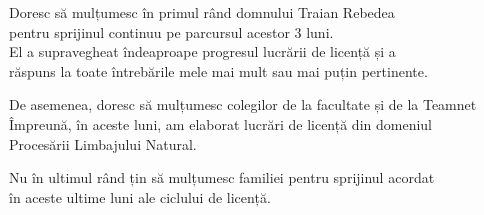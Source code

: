 \vspace*{7cm}
\begin{center}
Doresc să mulțumesc în primul rând domnului Traian Rebedea\\
pentru sprijinul continuu pe parcursul acestor 3 luni.\\
El a supravegheat îndeaproape progresul lucrării de licență și a\\
răspuns la toate întrebările mele mai mult sau mai puțin pertinente.
\end{center}

\vspace{0.6cm}
\begin{center}
De asemenea, doresc să mulțumesc colegilor de la facultate și de la Teamnet\\
Împreună, în aceste luni, am elaborat lucrări de licență din domeniul\\
Procesării Limbajului Natural.
\end{center}


\vspace{0.6cm}
\begin{center}
Nu în ultimul rând țin să mulțumesc familiei pentru sprijinul acordat\\
în aceste ultime luni ale ciclului de licență.
\end{center}
